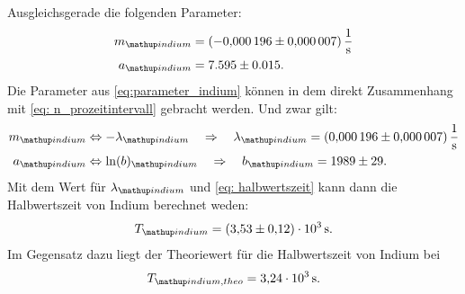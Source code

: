 Ausgleichsgerade die folgenden Parameter:
\begin{align}
  \label{eq:parameter_indium}
  \begin{aligned}
    m\ua{indium}&=\SI{-0.000196\pm0.000007}{\per\second}\\
    a\ua{indium}&=7.595\pm0.015.
  \end{aligned}
\end{align}
Die Parameter aus \eqref{eq:parameter_indium} können in dem direkt Zusammenhang mit
\eqref{eq: n_prozeitintervall} gebracht werden. Und zwar gilt:
\begin{align}
  \label{eq:parameter_indium_vergleich}
  \begin{aligned}
    m\ua{indium}&\Leftrightarrow -\lambda\ua{indium} \quad \Rightarrow \quad \lambda\ua{indium}=\SI{0.000196\pm0.000007}{\per\second}\\
    a\ua{indium}&\Leftrightarrow \ln(b)\ua{indium} \quad \Rightarrow \quad b\ua{indium} =1989\pm 29.
  \end{aligned}
\end{align}
Mit dem Wert für $\lambda\ua{indium}$ und \eqref{eq: halbwertszeit} kann dann die Halbwertszeit von Indium
berechnet weden:
\begin{equation}
  \label{eq:halbwertzeit_indium}
  T\ua{indium}=\SI{3.53\pm0.12 e+3}{\second}.
\end{equation}
Im Gegensatz dazu liegt der Theoriewert für die Halbwertszeit von Indium\cite{indium_halb} bei
\begin{equation}
  \label{eq:halbwertzeit_indium_theo}
  T\ua{indium,theo}=\SI{3.24 e+3}{\second}.
\end{equation}
